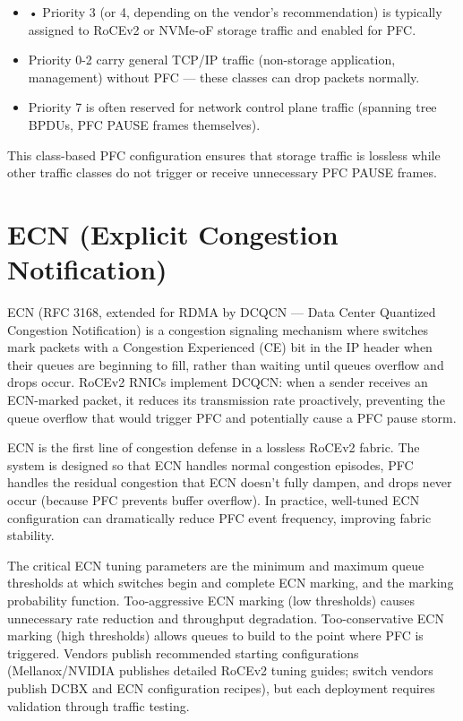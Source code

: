 \begin{itemize}
  \item • Priority 3 (or 4, depending on the vendor's recommendation) is typically assigned to RoCEv2 or NVMe-oF storage traffic and enabled for PFC.
  \item Priority 0-2 carry general TCP/IP traffic (non-storage application, management) without PFC --- these classes can drop packets normally.
  \item Priority 7 is often reserved for network control plane traffic (spanning tree BPDUs, PFC PAUSE frames themselves).
\end{itemize}

This class-based PFC configuration ensures that storage traffic is lossless while other traffic classes do not trigger or receive unnecessary PFC PAUSE frames.

\section{ECN (Explicit Congestion Notification)}
ECN (RFC 3168, extended for RDMA by DCQCN --- Data Center Quantized Congestion Notification) is a congestion signaling mechanism where switches mark packets with a Congestion Experienced (CE) bit in the IP header when their queues are beginning to fill, rather than waiting until queues overflow and drops occur. RoCEv2 RNICs implement DCQCN: when a sender receives an ECN-marked packet, it reduces its transmission rate proactively, preventing the queue overflow that would trigger PFC and potentially cause a PFC pause storm.

ECN is the first line of congestion defense in a lossless RoCEv2 fabric. The system is designed so that ECN handles normal congestion episodes, PFC handles the residual congestion that ECN doesn't fully dampen, and drops never occur (because PFC prevents buffer overflow). In practice, well-tuned ECN configuration can dramatically reduce PFC event frequency, improving fabric stability.

The critical ECN tuning parameters are the minimum and maximum queue thresholds at which switches begin and complete ECN marking, and the marking probability function. Too-aggressive ECN marking (low thresholds) causes unnecessary rate reduction and throughput degradation. Too-conservative ECN marking (high thresholds) allows queues to build to the point where PFC is triggered. Vendors publish recommended starting configurations (Mellanox/NVIDIA publishes detailed RoCEv2 tuning guides; switch vendors publish DCBX and ECN configuration recipes), but each deployment requires validation through traffic testing.

